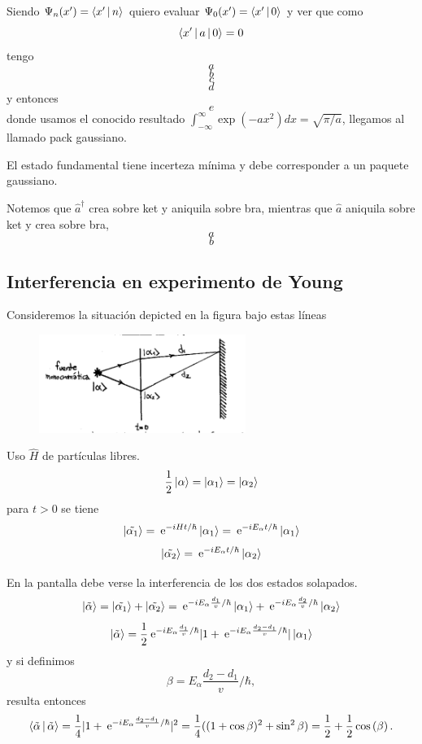 \documentclass[10pt,oneside]{CBFT_book}
\begin{document}
Siendo $\Psi_n(x') = \Braket{x'|n}$ quiero evaluar $\Psi_0(x') = \Braket{x'|0}$ y ver que como 
\[
	\Braket{x'|a|0}= 0 
\]
tengo 
\[
	a
\]
\[
	b
\]
\[
	c
\]
\[
	d
\]
y entonces 
\[
	e
\]
donde usamos el conocido resultado $\int_{-\infty}^\infty \exp( - a x^2) dx = \sqrt{\pi/a}$, llegamos al llamado pack 
gaussiano.

El estado fundamental tiene incerteza mínima y debe corresponder a un paquete gaussiano.

Notemos que $\hat{a}^\dagger$ crea sobre ket y aniquila sobre bra, mientras que $\hat{a}$ aniquila sobre ket y crea 
sobre bra,
\[
	a
\]
\[
	b
\]

\subsection{Interferencia en experimento de Young}

Consideremos la situación depicted en la figura bajo estas líneas

\begin{figure}[htb]
	\begin{center}
	\includegraphics[width=0.6\textwidth]{images/teo2_6.pdf}	 
	\end{center}
	\caption{}
\end{figure} 

Uso $\hat{H}$ de partículas libres.
\[
	\frac{1}{2} \Ket{\alpha} = \Ket{\alpha_1} = \Ket{\alpha_2}
\]
para $t>0$ se tiene 
\[
	\Ket{\tilde{\alpha_1}} = \:\mathrm{e}^{ -i H t /\hbar } \Ket{\alpha_1} =
		\:\mathrm{e}^{ -i E_\alpha t /\hbar } \Ket{\alpha_1}	
\]
\[
	\Ket{\tilde{\alpha_2}} = \:\mathrm{e}^{ -i E_\alpha t /\hbar } \Ket{\alpha_2}	
\]

En la pantalla debe verse la interferencia de los dos estados solapados.
\[
	\Ket{\tilde{\alpha}} = \Ket{\tilde{\alpha_1}} + \Ket{\tilde{\alpha_2}} =
		\:\mathrm{e}^{ -i E_\alpha \frac{d_1}{v} /\hbar } \Ket{\alpha_1} +
		\:\mathrm{e}^{ -i E_\alpha \frac{d_2}{v} /\hbar } \Ket{\alpha_2}	
\]
\[
	\Ket{\tilde{\alpha}} = \frac{1}{2} \:\mathrm{e}^{ -i E_\alpha \frac{d_1}{v} /\hbar } 
		| 1 + \:\mathrm{e}^{ -i E_\alpha \frac{d_2-d_1}{v} /\hbar } | \Ket{\alpha_1}
\]
y si definimos
\[
	\beta=E_\alpha \frac{d_2-d_1}{v} /\hbar,
\]
resulta entonces
\[
	\Braket{\tilde{\alpha}|\tilde{\alpha}} = \frac{1}{4}| 1 +  \:\mathrm{e}^{ -i E_\alpha \frac{d_2-d_1}{v} /\hbar } |^2 =
		\frac{1}{4}( (1+\cos\beta)^2 + \sin^2\beta ) =
			\frac{1}{2} + \frac{1}{2}\cos\left( \beta \right).
\]
\end{document}
